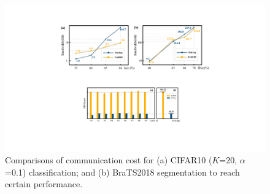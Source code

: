 \documentclass[letterpaper]{article} %
\begin{document}

\begin{figure}[b]
\centering
\includegraphics[width=\linewidth]{fig/fig5.pdf}
\caption{ Comparisons of communication cost for (a) CIFAR10 ($K$=20, $\alpha$=0.1) classification; and (b) BraTS2018 segmentation to reach certain performance.
} 
\label{fig:bandwidth}
\end{figure}
\end{document}
